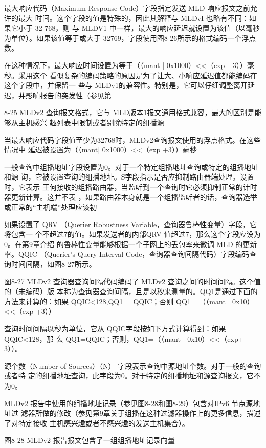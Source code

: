 最大响应代码（Maximum Response Code）字段指定发送 MLD 响应报文之前允许的最大
时间。这个字段的值是特殊的，因此其解释与 MLDvI 也略有不同：如果它小于 32 768，则
与 MLDV1 中一样，最大的响应延迟就设置为该值（以毫秒为单位）。如果该值等于或大于
32769，字段使用图8-26所示的格式编码一个浮点数。

在这种情况下，最大响应时间设置为等于（（mant | 0x1000）<<（exp +3））毫秒。采用这个
看似复杂的编码策略的原因是为了让大、小响应延迟值都能编码在这个字段中，并保留一
些与 MLDv1的兼容性。特别是，它可以仔细调整离开延迟，并影响报告的突发性（参见第

8-25 MLDv2 查询报文格式，它与 MLD版本1报文通用格式兼容，最大的区别是能够从主机感兴
趣列表中限制或者剔除特定的组播源

当最大响应代码字段值至少为32768时，MLDv2查询报文使用的浮点格式。在这些情况中
延迟被设置为（（mant| 0x1000）<<（exp +3））毫秒

一般查询中组播地址字段设置为0。对于一个特定组播地址查询或特定的组播地址和源
询，它被设置查询的组播地址。S字段指示是否应抑制路由器端处理。设置时，它表示
王何接收的组播路由器，当监听到一个查询时它必须抑制正常的计时器更新计算。这并不表
，如果路由器本身就是一个组播监听者的话，查询器选举或正常的“主机端”处理应该初

如果设置了 QRV （Querier Robustness Variable，查询器鲁棒性变量）字段，它将包含一
个不超过7的值。如果发送者的内部QRV 值超过7，那么这个字段应设为0。在第9章介绍
的鲁棒性变量能够根据一个子网上的丢包率来微调 MLD 的更新率。QQIC （Querier’s Query
Interval Code，查询器查询间隔代码）字段编码查询时间间隔，如图8-27所示。


图8-27 MLDv2 查询器查询间隔代码编码了 MLDv2 查询之间的时间间隔。这个值的（未编码）版
本称为查询器查询间隔，且是以秒来测量的。QQ1是通过下面的方法来计算的：如果
QQIC<128,QQ1 = QQIC；否则 QQ1= （（mant | 0x10）<<（exp +3））

查询时间间隔以秒为单位，它从 QQIC字段按如下方式计算得到：如果QQIC<128，那
么 QQ1=QQIC；否则，QQ1=（（mant | 0x10）<<（exp+ 3））。

源个数（Number of Sources）（N） 字段表示查询中源地址个数。对于一般的查询或者特
定的组播地址查询，此字段为0。对于特定的组播地址和源查询报文，它不为0。

MLDv2 报告中使用的组播地址记录（参见图8-28和图8-29）包含对IPv6 节点源地址过
滤器所做的修改（参见第9章关于组播在这种过滤器操作上的更多信息，描述了对特定接收
主机感兴趣或者不感兴趣的发送主机集合）。

图8-28 MLDv2 报告报文包含了一组组播地址记录向量

